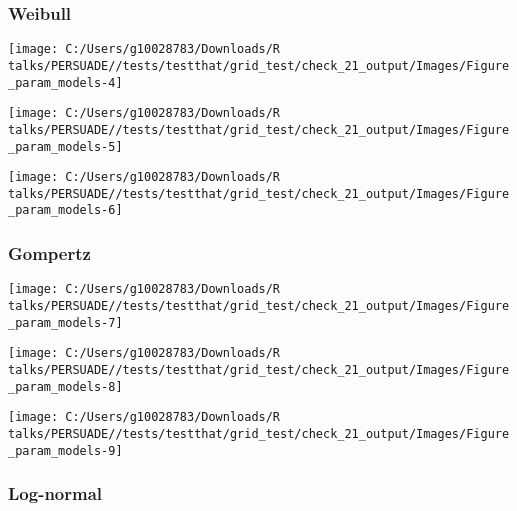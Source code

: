 \documentclass[
]{article}
\begin{document}
\subsubsection{Weibull}\label{weibull}

\begin{flushleft}\texttt{[image: C:/Users/g10028783/Downloads/R talks/PERSUADE//tests/testthat/grid\_test/check\_21\_output/Images/Figure\_param\_models-4]} \end{flushleft}

\begin{flushleft}\texttt{[image: C:/Users/g10028783/Downloads/R talks/PERSUADE//tests/testthat/grid\_test/check\_21\_output/Images/Figure\_param\_models-5]} \end{flushleft}

\begin{flushleft}\texttt{[image: C:/Users/g10028783/Downloads/R talks/PERSUADE//tests/testthat/grid\_test/check\_21\_output/Images/Figure\_param\_models-6]} \end{flushleft}

\clearpage

\subsubsection{Gompertz}\label{gompertz}

\begin{flushleft}\texttt{[image: C:/Users/g10028783/Downloads/R talks/PERSUADE//tests/testthat/grid\_test/check\_21\_output/Images/Figure\_param\_models-7]} \end{flushleft}

\begin{flushleft}\texttt{[image: C:/Users/g10028783/Downloads/R talks/PERSUADE//tests/testthat/grid\_test/check\_21\_output/Images/Figure\_param\_models-8]} \end{flushleft}

\begin{flushleft}\texttt{[image: C:/Users/g10028783/Downloads/R talks/PERSUADE//tests/testthat/grid\_test/check\_21\_output/Images/Figure\_param\_models-9]} \end{flushleft}

\clearpage

\subsubsection{Log-normal}\label{log-normal}
\end{document}
